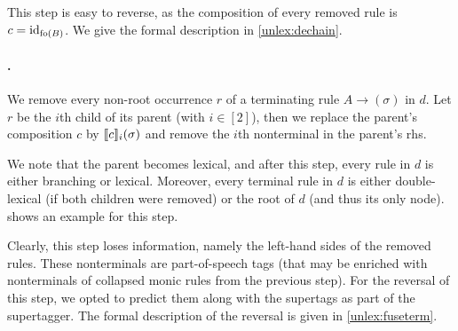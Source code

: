 \documentclass[../../document.tex]{subfiles}
\begin{document}
    This step is easy to reverse, as the composition of every removed rule is $c = \operatorname{id}_{\operatorname{fo}(B)}$.
    We give the formal description in \cref{unlex:dechain}.

    \paragraph{.}
    We remove every non-root occurrence $r$ of a terminating rule $A \to (\sigma)$ in $d$.
    Let $r$ be the $i$th child of its parent (with $i \in [2]$), then we replace the parent's composition $c$ by $\llbracket c\rrbracket_i(\sigma)$ and remove the $i$th nonterminal in the parent's rhs.

    We note that the parent becomes lexical, and after this step, every rule in $d$ is either branching or lexical.
    Moreover, every terminal rule in $d$ is either double-lexical (if both children were removed) or the root of \(d\) (and thus its only node).
     shows an example for this step.

    Clearly, this step loses information, namely the left-hand sides of the removed rules.
    These nonterminals are part-of-speech tags (that may be enriched with nonterminals of collapsed monic rules from the previous step).
    For the reversal of this step, we opted to predict them along with the supertags as part of the supertagger.
    The formal description of the reversal is given in \cref{unlex:fuseterm}.
\end{document}
